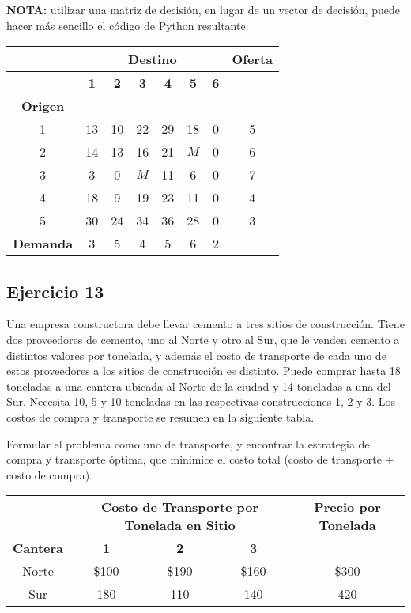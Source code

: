 \documentclass[12pt]{article}
\begin{document}
\textbf{NOTA:} utilizar una matriz de decisión, en lugar de un vector de decisión, puede hacer más sencillo el código de Python resultante.

\begin{center}
\begin{tabular}{c|cccccc|c}
\hline
& \multicolumn{6}{c|}{\textbf{Destino}} & \textbf{Oferta} \\
\hline
& \textbf{1} & \textbf{2} & \textbf{3} & \textbf{4} & \textbf{5} & \textbf{6} &  \\
\hline
\textbf{Origen} & & & & & & & \\
1 & 13 & 10 & 22 & 29 & 18 & 0 & 5 \\
2 & 14 & 13 & 16 & 21 & $M$ & 0 & 6 \\
3 & 3 & 0 & $M$ & 11 & 6 & 0 & 7 \\
4 & 18 & 9 & 19 & 23 & 11 & 0 & 4 \\
5 & 30 & 24 & 34 & 36 & 28 & 0 & 3 \\
\hline
\textbf{Demanda} & 3 & 5 & 4 & 5 & 6 & 2 & \\
\hline
\end{tabular}
\end{center}

\subsection{Ejercicio 13}

Una empresa constructora debe llevar cemento a tres sitios de construcción. Tiene dos proveedores de cemento, uno al Norte y otro al Sur, que le venden cemento a distintos valores por tonelada, y además el costo de transporte de cada uno de estos proveedores a los sitios de construcción es distinto. Puede comprar hasta 18 toneladas a una cantera ubicada al Norte de la ciudad y 14 toneladas a una del Sur. Necesita 10, 5 y 10 toneladas en las respectivas construcciones 1, 2 y 3. Los costos de compra y transporte se resumen en la siguiente tabla.

Formular el problema como uno de transporte, y encontrar la estrategia de compra y transporte óptima, que minimice el costo total (costo de transporte + costo de compra).

\begin{center}
\begin{tabular}{c|ccc|c}
\toprule
& \multicolumn{3}{c|}{\textbf{Costo de Transporte por Tonelada en Sitio}} & \textbf{Precio por Tonelada} \\
\cmidrule(lr){2-4} 
\textbf{Cantera} & \textbf{1} & \textbf{2} & \textbf{3} & \\
\midrule
Norte & \$100 & \$190 & \$160 & \$300 \\
Sur & 180 & 110 & 140 & 420 \\
\bottomrule
\end{tabular}
\end{center}
\end{document}
